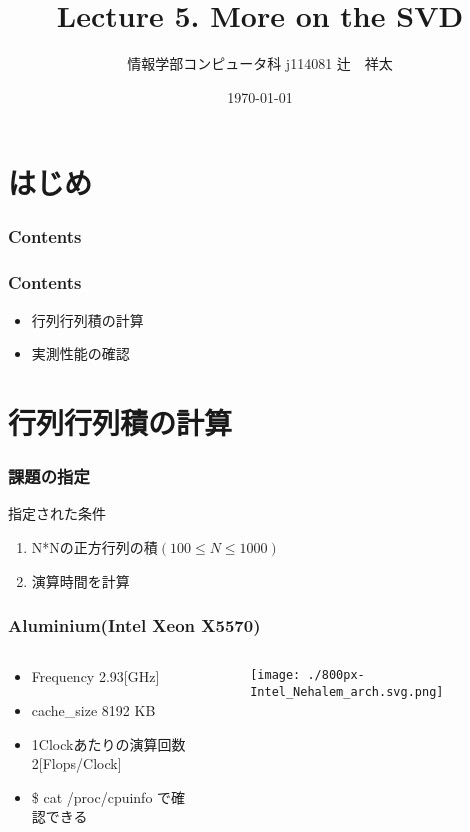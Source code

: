 \documentclass[dvipdfmx]{beamer}
\title[数値アルゴリズム特論]{Lecture 5. More on the SVD}
\institute{Kogakuin University}
\author[Shota Tsuji]{情報学部コンピュータ科 j114081 辻　祥太}
\date{\today}
\begin{document}
\section*{はじめ}
\begin{frame}
  \titlepage \end{frame} 
\begin{frame}[plain]
  \frametitle{Contents}
  \tableofcontents
\end{frame}

\begin{frame}
  \frametitle{Contents}
  \begin{itemize}
    \item 行列行列積の計算
    \item 実測性能の確認
  \end{itemize}
\end{frame}

\section{行列行列積の計算}
\begin{frame}
  \frametitle{課題の指定}
  指定された条件
  \begin{enumerate}
		\item N*Nの正方行列の積$(100\leq N \leq 1000)$
		\item 演算時間を計算
  \end{enumerate}
\end{frame}


\begin{frame}
	\frametitle{Aluminium(Intel Xeon X5570)}
	\begin{columns}
	\begin{column}{0.48\textwidth}
	\begin{itemize}
		\item Frequency 2.93[GHz]
		\item cache\_size 8192 KB
		\item 1Clockあたりの演算回数\\ 2[Flops/Clock]
	\end{itemize}

	\begin{itemize}
		\item \$ cat /proc/cpuinfo で確認できる
	\end{itemize}
	\end{column}

	\begin{column}{0.48\textwidth}
	\begin{figure}
	\texttt{[image: ./800px-Intel\_Nehalem\_arch.svg.png]}
	\end{figure}
	\end{column}
	\end{columns}
\end{frame}
\end{document}
